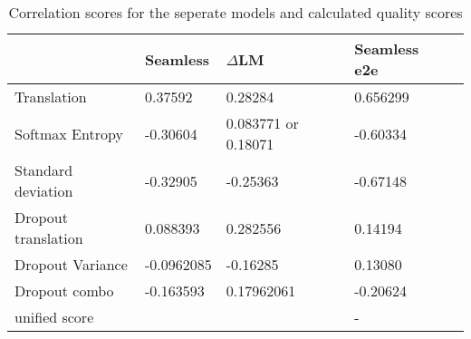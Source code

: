 \begin{table}[ht]
\begin{tabular}{l|llll}
    & Seamless & $\Delta$LM&  Seamless e2e\\ \hline
Translation & 0.37592 & 0.28284 & 0.656299\\ 
Softmax Entropy & -0.30604   & 0.083771 or  0.18071 & -0.60334 \\
Standard deviation & -0.32905  & -0.25363& -0.67148 \\ \hline

Dropout translation &  0.088393  & 0.282556& 0.14194\\

Dropout Variance &-0.0962085 & -0.16285& 0.13080\\
Dropout combo & -0.163593& 0.17962061& -0.20624\\
\hline
unified score   &  &  & - 

\end{tabular}
\label{results}
\caption{Correlation scores for the seperate models and calculated quality scores}
\end{table}
